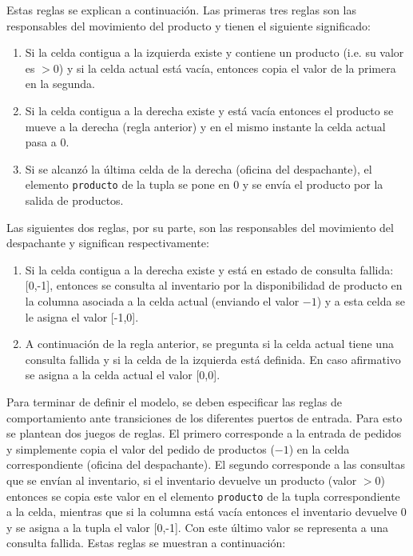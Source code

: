 \documentclass[10pt]{article}
\begin{document}
Estas reglas se explican a continuación. Las primeras tres reglas son las responsables del movimiento del producto y tienen el siguiente significado:
\begin{enumerate}
	\item Si la celda contigua a la izquierda existe y contiene un producto (i.e. su valor es $>0$) y si la celda actual está vacía, entonces copia el valor de la primera en la segunda. 
	\item Si la celda contigua a la derecha existe y está vacía entonces el producto se mueve a la derecha (regla anterior) y en el mismo instante la celda actual pasa a $0$.
	\item Si se alcanzó la última celda de la derecha (oficina del despachante), el elemento \texttt{producto} de la tupla se pone en $0$ y se envía el producto por la salida de productos.
\end{enumerate}

\noindent Las siguientes dos reglas, por su parte, son las responsables del movimiento del despachante y significan respectivamente:
\begin{enumerate}
	\item Si la celda contigua a la derecha existe y está en estado de consulta fallida: [0,-1], entonces se consulta al inventario por la disponibilidad de producto en la columna asociada a la celda actual (enviando el valor $-1$) y a esta celda se le asigna el valor [-1,0]. 
	\item A continuación de la regla anterior, se pregunta si la celda actual tiene una consulta fallida y si la celda de la izquierda está definida. En caso afirmativo se asigna a la celda actual el valor [0,0].
\end{enumerate}

Para terminar de definir el modelo, se deben especificar las reglas de comportamiento ante transiciones de los diferentes puertos de entrada. Para esto se plantean dos juegos de reglas. El primero corresponde a la entrada de pedidos y simplemente copia el valor del pedido de productos ($-1$) en la celda correspondiente (oficina del despachante). El segundo corresponde a las consultas que se envían al inventario, si el inventario devuelve un producto (valor $>0$) entonces se copia este valor en el elemento \texttt{producto} de la tupla correspondiente a la celda, mientras que si la columna está vacía entonces el inventario devuelve $0$ y se asigna a la tupla el valor [0,-1]. Con este último valor se representa a una consulta fallida. Estas reglas se muestran a continuación:
\end{document}
